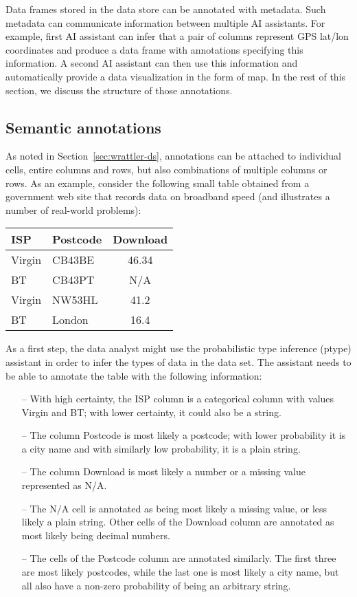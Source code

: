 \documentclass[sigplan,preprint,10pt]{acmart}\settopmatter{printfolios=true,printccs=false,printacmref=false}
\begin{document}
{Data frames stored in the data store can be annotated with
metadata. Such metadata can communicate information between multiple
AI assistants. For example, first AI assistant can infer that a pair
of columns represent GPS lat/lon coordinates and produce a data frame
with annotations specifying this information. A second AI assistant
can then use this information and automatically provide a data
visualization in the form of map. In the rest of this section, we
discuss the structure of those annotations.

\subsection{Semantic annotations}
As noted in Section~\ref{sec:wrattler-ds}, annotations can be attached to individual cells,
entire columns and rows, but also combinations of multiple columns or rows. As an example,
consider the following small table obtained from a government web site that records data 
on broadband speed (and illustrates a number of real-world problems):

\vspace{1em}
\begin{tabular}{llc}
\toprule
\textbf{ISP}\qquad\qquad\qquad & \textbf{Postcode}\qquad\qquad & \textbf{Download} \\
\midrule
Virgin & CB43BE & 46.34 \\
BT & CB43PT & N/A \\
Virgin & NW53HL & 41.2 \\
BT & London & 16.4 \\
\bottomrule
\end{tabular}
\vspace{1em}

\noindent
As a first step, the data analyst might use the probabilistic type inference (ptype) assistant
in order to infer the types of data in the data set. The assistant needs to be able to annotate
the table with the following information:
%
\begin{itemize}
\item[--] With high certainty, the ISP column is a categorical column with values Virgin and BT;
  with lower certainty, it could also be a string.
\item[--] The column Postcode is most likely a postcode; with lower probability it is a city name
  and with similarly low probability, it is a plain string.
\item[--] The column Download is most likely a number or a missing value represented as N/A.  
\item[--] The N/A cell is annotated as being most likely a missing value, or less likely a plain 
  string. Other cells of the Download column are annotated as most likely being decimal numbers.
\item[--] The cells of the Postcode column are annotated similarly. The first three are most
  likely postcodes, while the last one is most likely a city name, but all also have a non-zero
  probability of being an arbitrary string.
\end{itemize}

}
\end{document}
